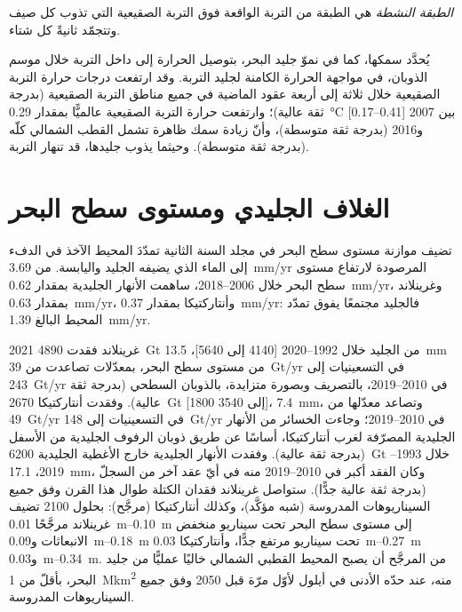 \begin{definition}\label{def:b3:glaciology:permafrost}
\emph{الطبقة النشطة} هي الطبقة من التربة الواقعة فوق
التربة الصقيعية التي تذوب كل صيف وتتجمّد ثانيةً كل شتاء.
\end{definition}

يُحدَّد سمكها، كما في نموّ جليد البحر، بتوصيل الحرارة
إلى داخل التربة خلال موسم الذوبان، في مواجهة الحرارة الكامنة لجليد
التربة. وقد ارتفعت درجات حرارة التربة الصقيعية خلال ثلاثة إلى
أربعة عقود الماضية في جميع مناطق التربة الصقيعية (بدرجة ثقة عالية)؛
وارتفعت حرارة التربة الصقيعية عالميًّا بمقدار \qty{0.29}{\celsius} [\numrange{0.17}{0.41}]
بين 2007 و2016 (بدرجة ثقة متوسطة)، وأنّ زيادة سمك
 ظاهرة تشمل القطب الشمالي كلّه (بدرجة ثقة متوسطة).
وحيثما يذوب جليدها، قد تنهار التربة.

\section{الغلاف الجليدي ومستوى سطح البحر}\label{sec:b3:glaciology:sea-level}

تضيف موازنة مستوى سطح البحر في مجلد السنة الثانية تمدّدَ المحيط الآخذ في الدفء
إلى الماء الذي يضيفه الجليد واليابسة. من
\qty{3.69}{mm/yr} المرصودة لارتفاع مستوى سطح البحر خلال 2006--2018، ساهمت الأنهار الجليدية
بمقدار \qty{0.62}{mm/yr}، وغرينلاند بمقدار \qty{0.63}{mm/yr}، وأنتاركتيكا
بمقدار \qty{0.37}{mm/yr}: فالجليد مجتمعًا يفوق تمدّد المحيط البالغ
\qty{1.39}{mm/yr}.

\begin{dated}{2021}
غرينلاند فقدت \qty{4890}{Gt} من الجليد خلال 1992--2020 [4140 إلى 5640]،
\qty{13.5}{mm} من مستوى سطح البحر، بمعدّلات تصاعدت من \qty{39}{Gt/yr} في
التسعينيات إلى \qty{243}{Gt/yr} في 2010--2019، بالتصريف وبصورة متزايدة،
بالذوبان السطحي (بدرجة ثقة عالية). وفقدت أنتاركتيكا \qty{2670}{Gt}
[1800 إلى 3540]، \qty{7.4}{mm}، وتصاعد معدّلها من \qty{49}{Gt/yr} في
التسعينيات إلى \qty{148}{Gt/yr} في 2010--2019؛ وجاءت الخسائر من الأنهار الجليدية المصرّفة لغرب
أنتاركتيكا، أساسًا عن طريق ذوبان الرفوف الجليدية من الأسفل (بدرجة ثقة عالية).
وفقدت الأنهار الجليدية خارج الأغطية الجليدية \qty{6200}{Gt} خلال
1993--2019، \qty{17.1}{mm}، وكان الفقد أكبر في 2010--2019 منه في أيّ عقد آخر من
السجلّ (بدرجة ثقة عالية جدًّا). ستواصل غرينلاند فقدان الكتلة
طوال هذا القرن وفق جميع السيناريوهات المدروسة (شبه مؤكَّد)، وكذلك
أنتاركتيكا (مرجَّح): بحلول 2100 تضيف غرينلاند مرجَّحًا
\qtyrange{0.01}{0.10}{m} إلى مستوى سطح البحر تحت سيناريو منخفض الانبعاثات
و\qtyrange{0.09}{0.18}{m} تحت سيناريو مرتفع جدًّا، وأنتاركتيكا
\qtyrange{0.03}{0.27}{m} و\qtyrange{0.03}{0.34}{m}. من المرجَّح أن يصبح المحيط القطبي الشمالي
خاليًا عمليًّا من جليد البحر، بأقلّ من
\qty{1}{\mega km^2} منه، عند حدّه الأدنى في أيلول لأوّل مرّة
قبل 2050 وفق جميع السيناريوهات المدروسة.
\end{dated}

